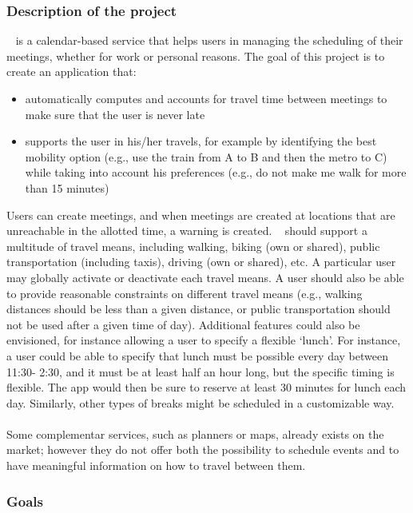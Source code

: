 \subsubsection{Description of the project}

\projectname~ is a calendar-based service that helps users in managing the scheduling of their meetings, whether for work or personal reasons.
The goal of this project is to create an application that: 
\begin{itemize}
\item automatically computes and accounts for travel time between meetings to make sure that the user is never late
\item supports the user in his/her travels, for example by identifying the best mobility option (e.g., use the train from A to B and then the metro to C) while taking into account his preferences (e.g., do not make me walk for more than 15 minutes)
\end{itemize}
Users can create meetings, and when meetings are created at locations that are unreachable in the allotted time, a warning is created. \projectname~ should support a multitude of travel means, including walking, biking (own or shared), public transportation (including taxis), driving (own or shared), etc. A particular user may globally activate or deactivate each travel means. A user should also be able to provide reasonable constraints on different travel means (e.g., walking distances should be less than a given distance, or public transportation should not be used after a given time of day). Additional features could also be envisioned, for instance allowing a user to specify a flexible `lunch'. For instance, a user could be able to specify that lunch must be possible every day between 11:30- 2:30, and it must be at least half an hour long, but the specific timing is flexible. The app would then be sure to reserve at least 30 minutes for lunch each day. Similarly, other types of breaks might be scheduled in a customizable way.
\\
\\
Some complementar services, such as planners or maps, already exists on the market; however they do not offer both the possibility to schedule events and to have meaningful information on how to travel between them.

\subsubsection{Goals}


